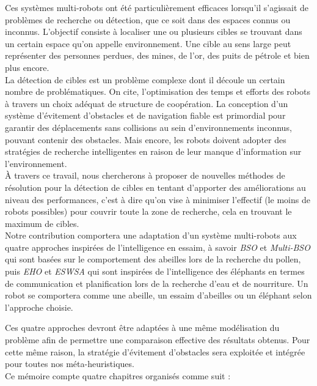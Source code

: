 Ces systèmes multi-robots ont été particulièrement efficaces lorsqu'il s'agissait de problèmes de recherche ou détection, que ce soit dans des espaces connus ou inconnus. L'objectif consiste à localiser une ou plusieurs cibles se trouvant dans un certain espace qu'on appelle environnement. Une cible au sens large peut représenter des personnes perdues, des mines, de l'or, des puits de pétrole et bien plus encore.\\

La détection de cibles est un problème  complexe dont il découle un certain nombre de problématiques. On cite, l'optimisation des temps et efforts des robots à travers un choix adéquat de structure de coopération.  La conception d'un système d'évitement d'obstacles et de navigation fiable est primordial pour garantir des déplacements sans collisions au sein d'environnements inconnus, pouvant contenir des obstacles. Mais encore, les robots doivent adopter des stratégies de recherche intelligentes en raison de leur manque d'information sur l'environnement.\\
 


À travers ce travail, nous chercherons à proposer de nouvelles méthodes de résolution pour la détection de cibles en tentant d'apporter des améliorations au niveau des performances, c'est à dire qu'on vise à minimiser l'effectif (le moins de robots possibles) pour couvrir toute la zone de recherche, cela en trouvant le maximum de cibles.\\

 Notre contribution comportera une adaptation d'un système multi-robots aux quatre approches inspirées de l'intelligence en essaim, à savoir \textit{BSO} et \textit{Multi-BSO} qui sont basées sur le comportement des abeilles lors de la recherche du pollen, puis \textit{EHO} et \textit{ESWSA} qui sont inspirées de l'intelligence des éléphants en termes de communication et planification lors de la recherche d'eau et de nourriture. Un robot se comportera comme une abeille, un essaim d'abeilles ou un éléphant selon l'approche choisie.

Ces quatre approches devront être adaptées à une même modélisation du problème afin de permettre une comparaison effective des résultats obtenus. Pour cette même raison, la stratégie d'évitement d'obstacles sera exploitée et intégrée pour toutes nos méta-heuristiques.\\ 

Ce mémoire compte quatre chapitres organisés comme suit :


